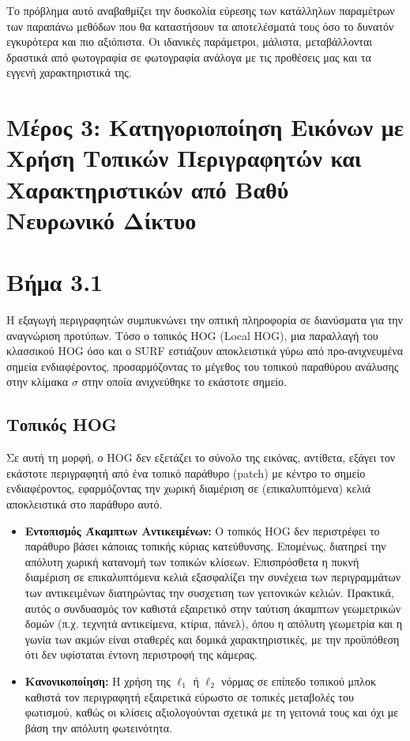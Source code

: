 \documentclass[12pt,a4paper]{article}
\begin{document}
Το πρόβλημα αυτό αναβαθμίζει την δυσκολία εύρεσης των κατάλληλων παραμέτρων των παραπάνω μεθόδων που θα καταστήσουν τα αποτελέσματά τους όσο το δυνατόν εγκυρότερα και πιο αξιόπιστα. Οι ιδανικές παράμετροι, μάλιστα, μεταβάλλονται δραστικά από φωτογραφία σε φωτογραφία ανάλογα με τις προθέσεις μας και τα εγγενή χαρακτηριστικά της.

\section*{Μέρος 3: Κατηγοριοποίηση Εικόνων με Χρήση Τοπικών Περιγραφητών
και Χαρακτηριστικών από Βαθύ Νευρωνικό Δίκτυο}

\section*{Βήμα 3.1}

\hspace{0.6cm}Η εξαγωγή περιγραφητών συμπυκνώνει την οπτική πληροφορία σε διανύσματα για την αναγνώριση προτύπων. Τόσο ο τοπικός \foreignlanguage{english}{HOG (Local HOG)}, μια παραλλαγή του κλασσικού \foreignlanguage{english}{HOG} όσο και ο \foreignlanguage{english}{SURF} εστιάζουν αποκλειστικά γύρω από προ-ανιχνευμένα σημεία ενδιαφέροντος, προσαρμόζοντας το μέγεθος του τοπικού παραθύρου ανάλυσης στην κλίμακα $\sigma$ στην οποία ανιχνεύθηκε το εκάστοτε σημείο.

\subsection*{Τοπικός \foreignlanguage{english}{HOG}}
\hspace{0.6cm}Σε αυτή τη μορφή, ο \foreignlanguage{english}{HOG} δεν εξετάζει το σύνολο της εικόνας, αντίθετα, εξάγει τον εκάστοτε περιγραφητή από ένα τοπικό παράθυρο (\foreignlanguage{english}{patch}) με κέντρο το σημείο ενδιαφέροντος, εφαρμόζοντας την χωρική διαμέριση σε (επικαλυπτόμενα) κελιά αποκλειστικά στο παράθυρο αυτό. 

\begin{itemize}
    \item \textbf{Εντοπισμός Άκαμπτων Αντικειμένων:} Ο τοπικός \foreignlanguage{english}{HOG} δεν περιστρέφει το παράθυρο βάσει κάποιας τοπικής κύριας κατεύθυνσης. Επομένως, διατηρεί την απόλυτη χωρική κατανομή των τοπικών κλίσεων. Επισπρόσθετα η πυκνή διαμέριση σε επικαλυπτόμενα κελιά εξασφαλίζει την συνέχεια των περιγραμμάτων των αντικειμένων διατηρώντας την συσχετιση των γειτονικών κελιών. Πρακτικά, αυτός ο συνδυασμός τον καθιστά εξαιρετικό στην ταύτιση άκαμπτων γεωμετρικών δομών (π.χ. τεχνητά αντικείμενα, κτίρια, πάνελ), όπου η απόλυτη γεωμετρία και η γωνία των ακμών είναι σταθερές και δομικά χαρακτηριστικές, με την προϋπόθεση ότι δεν υφίσταται έντονη περιστροφή της κάμερας.
    \item \textbf{Κανονικοποίηση:} Η χρήση της $\ell_1$ ή $\ell_2$ νόρμας σε επίπεδο τοπικού μπλοκ καθιστά τον περιγραφητή εξαιρετικά εύρωστο σε τοπικές μεταβολές του φωτισμού, καθώς οι κλίσεις αξιολογούνται σχετικά με τη γειτονιά τους και όχι με βάση την απόλυτη φωτεινότητα.
\end{itemize}
\end{document}
